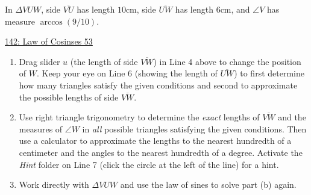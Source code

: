 \documentclass{ximera}
\begin{document}
\begin{question} \label{Q444f44tgHHERER}
In $\Delta VUW$, side $\overline{VU}$ has length $10$cm, side $\overline{UW}$ has length $6$cm, and  $\angle V$ has measure $\arccos(9/10)$.

\begin{onlineOnly}
    \begin{center}
\end{center}
\end{onlineOnly}

\href{https://www.desmos.com/calculator/a2m3iexwfx}{142: Law of Cosinses 53}

\begin{enumerate}
\item Drag slider $u$ (the length of side $\overline{VW}$) in Line 4 above to change the position of $W$. Keep your eye on Line 6 (showing the length of $\overline{UW}$) to first determine how many triangles satisfy the given conditions and second to approximate the possible lengths of side $\overline{VW}$.

\item Use right triangle trigonometry to determine the \emph{exact} lengths of $\overline{VW}$ and the measures of $\angle W$ in \emph{all} possible triangles satisfying the given conditions. Then use a calculator to approximate the lengths to the nearest hundredth of a centimeter and the angles to the nearest hundredth of a degree. Activate the \emph{Hint} folder on Line 7 (click the circle at the left of the line) for a hint.

\item Work directly with $\Delta VUW$ and use the law of sines to solve part (b) again.

 
\end{enumerate}

\end{question}
\end{document}
